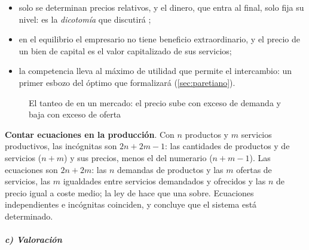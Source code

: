 \documentclass[11pt]{article}
\begin{document}
\begin{itemize}
\begin{itemize}
  \item solo se determinan precios relativos, y el dinero, que entra al final, solo fija su nivel: es la \emph{dicotomía} que  discutirá ;
  \item en el equilibrio el empresario no tiene beneficio extraordinario, y el precio de un bien de capital es el valor capitalizado de sus servicios;
  \item la competencia lleva al máximo de utilidad que permite el intercambio: un primer esbozo del óptimo que formalizará  (\ref{sec:paretiano}).
  \end{itemize}
\end{itemize}

\begin{figure}[H]
\centering
\caption{El tanteo de  en un mercado: el precio sube con exceso de demanda y baja con exceso de oferta}\label{fig:walras-tanteo}
\end{figure}

\begin{anotaciones}
\textbf{Contar ecuaciones en la producción}. Con $n$ productos y $m$ servicios productivos, las incógnitas son $2n+2m-1$: las cantidades de productos y de servicios ($n+m$) y sus precios, menos el del numerario ($n+m-1$). Las ecuaciones son $2n+2m$: las $n$ demandas de productos y las $m$ ofertas de servicios, las $m$ igualdades entre servicios demandados y ofrecidos y las $n$ de precio igual a coste medio; la ley de  hace que una sobre. Ecuaciones independientes e incógnitas coinciden, y  concluye que el sistema está determinado.
\end{anotaciones}

\subparagraph{c) Valoración}
\end{document}
